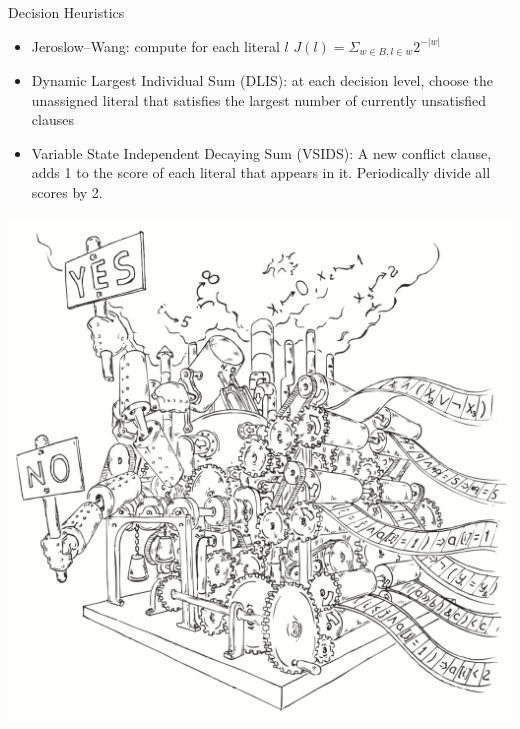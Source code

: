 \documentclass{beamer}
\begin{document}
\begin{frame}{Decision Heuristics}
\begin{itemize}
\item Jeroslow–Wang: compute for each literal $l$\newline
$J(l) = \Sigma_{w \in B, l \in w}2^{-|w|}$
\item Dynamic Largest Individual Sum (DLIS): at each decision level, choose the unassigned literal that satisfies the largest number of currently unsatisfied clauses
\item Variable State Independent Decaying Sum (VSIDS): A new conflict clause, adds 1 to the score of each literal that appears in it. Periodically divide all scores by 2.
\end{itemize}
\end{frame}

\begin{frame}
\includegraphics[scale=0.5]{../decision-procedure.png}
\end{frame}
\end{document}
